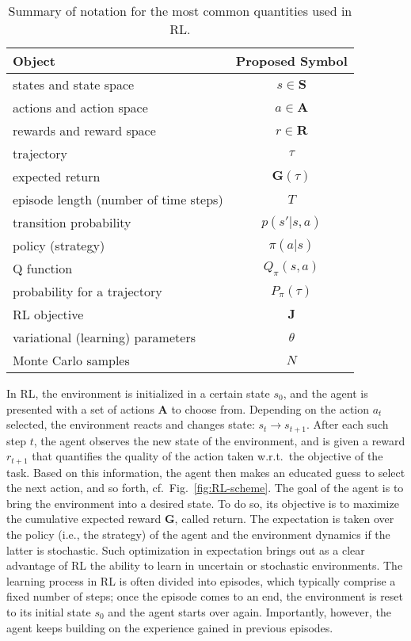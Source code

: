 \begin{table}[!h]
\centering
\begin{tabular}{|p{12.5cm}|c|}
\hline
Object & Proposed Symbol \\
\hline\hline
states and state space & $s\in\mathbf{S}$ \\
\hline
actions and action space & $a\in\mathbf{A}$ \\
\hline
rewards and reward space & $r\in\mathbf{R}$ \\
\hline
trajectory & $\tau$ \\
\hline
expected return & $\mathbf{G}(\tau)$ \\
\hline
episode length (number of time steps) & $T$ \\
\hline
transition probability & $p(s'|s,a)$ \\
\hline
policy (strategy) & $\pi(a|s)$ \\
\hline
Q function & $Q_\pi(s,a)$ \\
\hline
probability for a trajectory & $P_\pi(\tau)$ \\
\hline
RL objective & $\mathbf{J}$ \\
\hline
variational (learning) parameters & $\theta$ \\
\hline
Monte Carlo samples & $N$ \\
\hline

\hline
\end{tabular}
\caption{Summary of notation for the most common quantities used in RL.}
\label{table:RLSymbols}
\end{table}


In RL, the environment is initialized in a certain state $s_0$, and the agent is presented with a set of actions $\mathbf{A}$ to choose from. Depending on the action $a_t$ selected, the environment reacts and changes state: $s_t\to s_{t+1}$. After each such step $t$, the agent observes the new state of the environment, and is given a reward $r_{t+1}$ that quantifies the quality of the action taken w.r.t.~the objective of the task. Based on this information, the agent then makes an educated guess to select the next action, and so forth, cf.~Fig.~\ref{fig:RL-scheme}. The goal of the agent is to bring the environment into a desired state. To do so, its objective is to maximize the cumulative expected reward $\mathbf{G}$, called return. The expectation is taken over the policy (i.e., the strategy) of the agent and the environment dynamics if the latter is stochastic. Such optimization in expectation brings out as a clear advantage of RL the ability to learn in uncertain or stochastic environments. The learning process in RL is often divided into episodes, which typically comprise a fixed number of steps; once the episode comes to an end, the environment is reset to its initial state $s_0$ and the agent starts over again. Importantly, however, the agent keeps building on the experience gained in previous episodes. 

